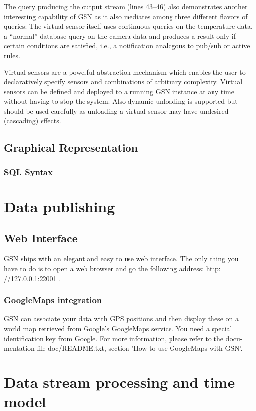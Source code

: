 The query producing the output stream (lines 43--46) also demonstrates another
interesting capability of GSN as it also mediates among three different flavors
of queries: The virtual sensor itself uses continuous queries on the
temperature data, a ``normal'' database query on the camera data and
produces a result only if certain conditions are satisfied, i.e., a
notification analogous to pub/sub or active rules.

Virtual sensors are a powerful abstraction mechanism which enables the user to
declaratively specify sensors and combinations of arbitrary complexity. Virtual
sensors can be defined and deployed to a running GSN instance at any time
without having to stop the system. Also dynamic unloading is supported but
should be used carefully as unloading a virtual sensor may have undesired
(cascading) effects. 


\subsection{Graphical Representation}

\subsubsection{SQL Syntax}

\section{Data publishing}

\subsection{Web Interface}

GSN ships with an elegant and easy to use web interface. The only thing
you have to do is to open a web browser and go the following address: http:
//127.0.0.1:22001 .

\subsubsection{GoogleMaps integration}
GSN can associate your data with GPS positions and then display these on
a world map retrieved from Google's GoogleMaps service. You need a special
identification key from Google. For more information, please refer to the docu-
mentation file doc/README.txt, section 'How to use GoogleMaps with GSN'.

\section{Data stream processing and time model}
\label{sec:data-stre-proc}

